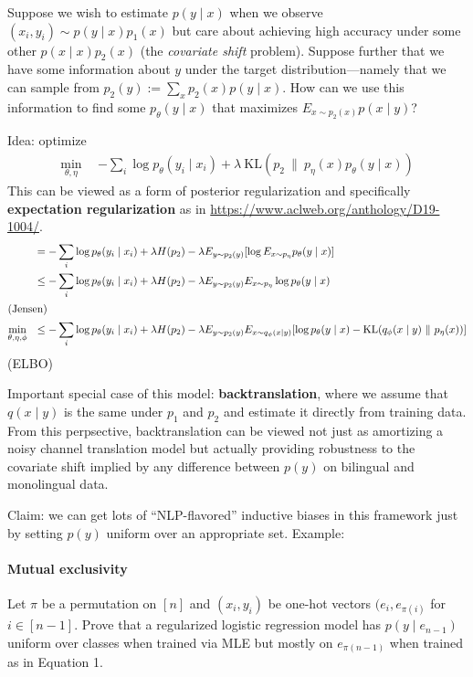 \documentclass{article}
\newcommand{\KL}[2]{\mathrm{KL}(#1~\|~#2)}
\begin{document}
Suppose we wish to estimate $p(y \mid x)$ when we observe $(x_i, y_i) \sim p(y
\mid x) p_1(x) $ but care about achieving high accuracy under some other $p(x
\mid x) p_2(x)$ (the \emph{covariate shift} problem). Suppose further that we
have some information about $y$ under the target distribution---namely that we
can sample from $p_2(y) := \sum_x p_2(x) p(y \mid x)$. How can we use this
information to find some $p_\theta(y \mid x)$ that maximizes $E_{x \sim p_2(x)} p(x
\mid y)$?

Idea: optimize
\begin{align}
  \min_{\theta,\eta} ~~ &-\sum_i \log p_\theta(y_i \mid x_i) + \lambda~\KL{p_2}{p_\eta(x)
  p_\theta(y \mid x)}
\end{align}
This can be viewed as a form of posterior regularization and specifically
\textbf{expectation regularization} as in
\url{https://www.aclweb.org/anthology/D19-1004/}.
\begin{align}
  &= -\sum_i \log p_\theta(y_i \mid x_i) + \lambda H(p_2) - \lambda E_{y \sim p_2(y)}
  [\log E_{x \sim p_\eta} p_\theta(y \mid x)] \\
  &\leq -\sum_i \log p_\theta(y_i \mid x_i) + \lambda H(p_2) -  \lambda E_{y \sim p_2(y)}
  E_{x \sim p_\eta} \log p_\theta(y \mid x) \\
  \intertext{(Jensen)}
  \min_{\theta, \eta, \phi} ~~ &\leq -\sum_i \log p_\theta(y_i \mid x_i) + \lambda H(p_2) -  \lambda E_{y \sim p_2(y)}
  E_{x \sim q_\phi(x \mid y)} [\log p_\theta(y \mid x) - \KL{q_\phi(x \mid y)}
  {p_\eta(x)}]
\end{align}
(ELBO)

Important special case of this model: \textbf{backtranslation}, where we assume
that $q(x \mid y)$ is the same under $p_1$ and $p_2$ and estimate it directly
from training data. From this perpsective, backtranslation can be viewed not
just as amortizing a noisy channel translation model but actually providing
robustness to the covariate shift implied by any difference between $p(y)$ on
bilingual and monolingual data.

Claim: we can get lots of ``NLP-flavored'' inductive biases in this framework
just by setting $p(y)$ uniform over an appropriate set. Example:

\paragraph{Mutual exclusivity}
Let $\pi$ be a permutation on $[n]$ and $(x_i, y_i)$ be one-hot vectors $(e_i,
e_{\pi(i)}$ for $i \in [n-1]$. Prove that a regularized logistic regression
model has $p(y \mid e_{n-1})$ uniform over classes when trained via MLE but
mostly on $e_{\pi(n-1)}$ when trained as in Equation 1.
\end{document}
